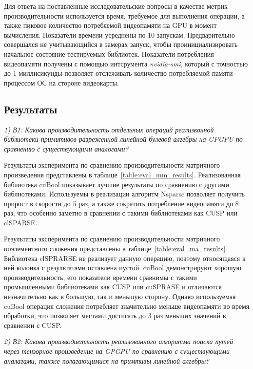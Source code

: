 Для ответа на поставленные исследовательские вопросы в качестве метрик производительности используется время, требуемое для выполнения операции, а также пиковое количество потребяемой видеопамяти на GPU в момент вычисления. Показатели времени усреднены по 10 запускам. Предварительно совершался не учитывающийся в замерах запуск, чтобы проинициализировать начальное состояние тестируемых библиотек. Показатели потребления видеопамяти получены с помощью интсрумента \textit{nvidia-smi}, который с точностью до $1$ миллисикунды позволяет отслеживать количество потребляемой памяти процессом ОС на стороне видеокарты. 

\subsection{Результаты}


\textit{1) В1: Какова производительность отдельных операций реализвонной библиотеки примитивов разреженной линейной булевой алгебры на GPGPU по сравнению с существующими аналогами?} 

Результаты эксперимента по сравнению производительности матричного произведения представлены в таблице~\ref{table:eval_mm_results}.
Реализованная библиотека cuBool показывает лучшие результаты по сравнению с другими библиотеками. 
Используемы в реализации алгоритм Nsparse позволяет получить прирост в скорости до 5 раз, а также сократить потребление видеопамяти до 8 раз, что особенно заметно в сравнении с такими библиотеками как CUSP или clSPARSE.

Результаты эксперимента по сравнению производительности матричного поэлементного сложения представлены в таблице~\ref{table:eval_ma_results}. 
Библиотека clSPRARSE не реализует данную операцию, поэтому относящаяся к ней колонка с результатами оставлена пустой.
cuBool демонстрируют хорошую производительность, его показатели времени сравнимы с такими промышленными библиотеками как CUSP или cuSPRASE и отличаются незначительно как в большую, так и меньшую сторону. 
Однако используемая cuBool операция сложения потребляет значительно меньше видеопамяти во время обработки, что позволяет местами достигать до 3 раз меньших значений в сравнении с CUSP.

\textit{2) В2: Какова производиетльность реализованного алгоритма поиска путей через тензорное произведение на GPGPU по сравнению с существующими аналагами, также полагающимися на примтивы линейной алгебры?}

